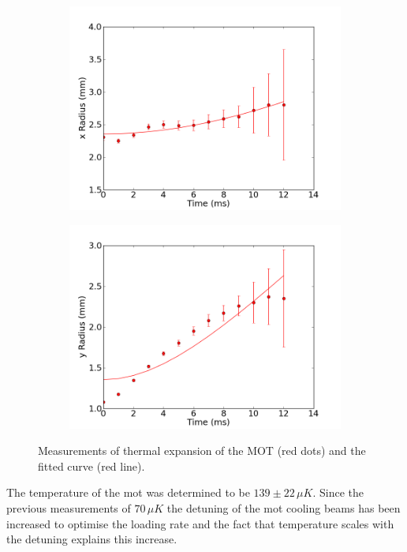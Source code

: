\begin{figure}[h]
\begin{subfigure}[b]{0.5\textwidth}
    \includegraphics[width=\textwidth]{figs/final_temp_fitting_x.png}
\end{subfigure}\begin{subfigure}[b]{0.5\textwidth}
    \includegraphics[width=\textwidth]{figs/final_temp_fitting_y.png}
\end{subfigure}
\caption{Measurements of thermal expansion of the MOT (red dots) and the fitted curve (red line).}
\label{fig:temp_fits}
\end{figure}

The temperature of the \gls{mot} was determined to be $139\pm22\,\unit{\mu K}$. Since the previous measurements of $70\,\unit{\mu K}$\cite{sheludko_shaped_2010} the detuning of the \gls{mot} cooling beams has been increased to optimise the loading rate and the fact that temperature scales with the detuning explains this increase.

